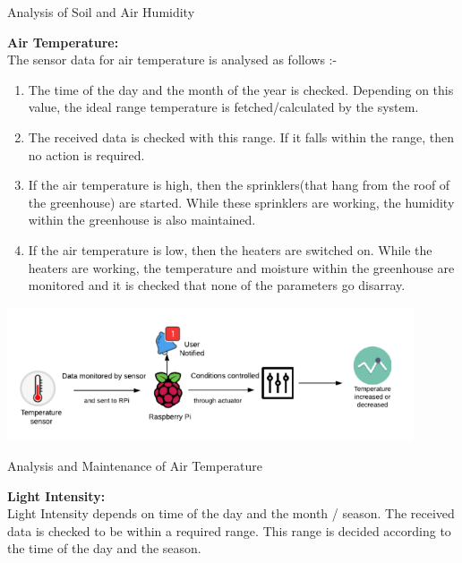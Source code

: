 \documentclass[12pt]{extarticle}
\begin{document}
\begin{enumerate}[label=\alph*]
\begin{enumerate}[label=\arabic*]
                \begin{center}
                    Analysis of Soil and Air Humidity\\
                \end{center}
            \end{enumerate}
            \textbf{Air Temperature:}\\
            The sensor data for air temperature is analysed as follows :-
            \begin{enumerate}[label=\arabic*]
                \item
                The time of the day and the month of the year is checked. Depending on this value, the ideal range temperature is fetched/calculated by the system.
                \item
                The received data is checked with this range. If it falls within the range, then no action is required.
                \item
                If the air temperature is high, then the sprinklers(that hang from the roof of the greenhouse) are started. While these sprinklers are working, the humidity within the greenhouse is also maintained.
                \item
                If the air temperature is low, then the heaters are switched on. While the heaters are working, the temperature and moisture within the greenhouse are monitored and it is checked that none of the parameters go disarray.
            \end{enumerate}
            \includegraphics[width=12cm]{AirTemp.png}
            \begin{center}
                Analysis and Maintenance of Air Temperature\\
            \end{center}
            \textbf{Light Intensity:}
            \\Light Intensity depends on time of the day and the month / season. The received data is checked to be within a required range. This range is decided according to the time of the day and the season.
                \begin{enumerate}[label=\arabic*]

\end{enumerate}
\end{enumerate}
\end{document}
